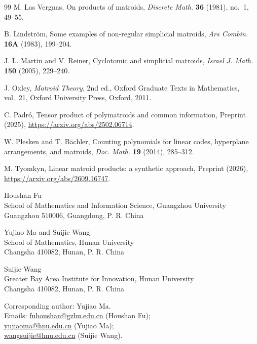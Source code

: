 \documentclass[12pt,a4paper]{article}
\numberwithin{equation}{section}
\theoremstyle{definition}
\theoremstyle{remark}
\begin{document}
\begin{thebibliography}{99}
M. Las Vergnas,
On products of matroids,
\emph{Discrete Math.}
\textbf{36} (1981), no.~1, 49--55.

B. Lindstr\"om,
Some examples of non-regular simplicial matroids,
\emph{Ars Combin.}
\textbf{16A} (1983), 199--204.

J. L. Martin and V. Reiner,
Cyclotomic and simplicial matroids,
\emph{Israel J. Math.}
\textbf{150} (2005), 229--240.

J. Oxley,
\emph{Matroid Theory},
2nd ed., Oxford Graduate Texts in Mathematics, vol.~21,
Oxford University Press, Oxford, 2011.

C. Padr\'o,
Tensor product of polymatroids and common information,
Preprint (2025), \url{https://arxiv.org/abs/2502.06714}.

W. Plesken and T. B\"achler,
Counting polynomials for linear codes, hyperplane arrangements, and matroids,
\emph{Doc. Math.}
\textbf{19} (2014), 285--312.

M. Tyomkyn,
Linear matroid products: a synthetic approach,
Preprint (2026), \url{https://arxiv.org/abs/2609.16747}.

\end{thebibliography}


\bigskip
\noindent
Houshan Fu\\
School of Mathematics and Information Science, Guangzhou University\\
Guangzhou 510006, Guangdong, P. R. China

\medskip\noindent
Yujiao Ma and Suijie Wang\\
School of Mathematics, Hunan University\\
Changsha 410082, Hunan, P. R. China

\medskip\noindent
Suijie Wang\\
Greater Bay Area Institute for Innovation, Hunan University\\
Changsha 410082, Hunan, P. R. China

\medskip\noindent
Corresponding author: Yujiao Ma.\\
Emails: \href{mailto:fuhoushan@gzhu.edu.cn}{fuhoushan@gzhu.edu.cn} (Houshan Fu);\\
\href{mailto:yujiaoma@hnu.edu.cn}{yujiaoma@hnu.edu.cn} (Yujiao Ma);\\
\href{mailto:wangsuijie@hnu.edu.cn}{wangsuijie@hnu.edu.cn} (Suijie Wang).
\end{document}
